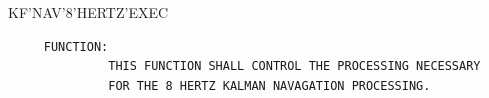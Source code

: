 \begin{frame}
KF'NAV'8'HERTZ'EXEC
\begin{verbatim}
     FUNCTION:
              THIS FUNCTION SHALL CONTROL THE PROCESSING NECESSARY
              FOR THE 8 HERTZ KALMAN NAVAGATION PROCESSING.


\end{verbatim}
\end{frame}
